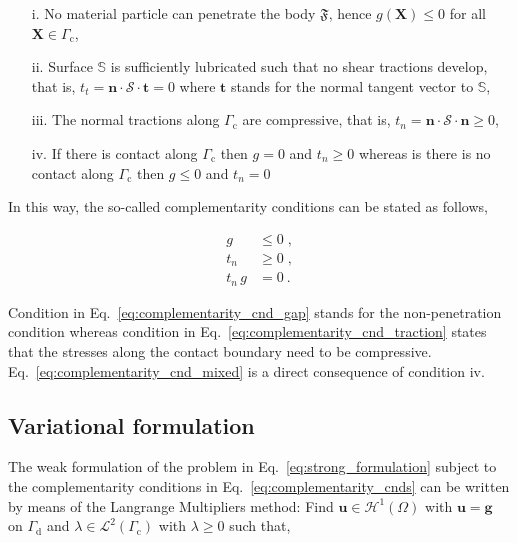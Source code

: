 \documentclass[10pt,a4paper]{article}
\begin{document}
\begin{itemize}

	\item[i.] No material particle can penetrate the body $\mathfrak{F}$, hence $g(\mathbf{X}) \le 0$ for all $\mathbf{X} \in \Gamma_{\text{c}}$,
	
	\item[ii.] Surface $\mathbb{S}$ is sufficiently lubricated such that no shear tractions develop, that is, $t_t = \mathbf{n} \cdot \boldsymbol{\mathcal{S}} \cdot \mathbf{t} = 0$ where $\mathbf{t}$ stands for the normal tangent vector to $\mathbb{S}$,
	
	\item[iii.] The normal tractions along $\Gamma_{\text{c}}$ are compressive, that is, $t_n = \mathbf{n} \cdot \boldsymbol{\mathcal{S}} \cdot \mathbf{n} \ge 0$,
	
	\item[iv.] If there is contact along $\Gamma_{\text{c}}$ then $g = 0$ and $t_n \ge 0$ whereas is there is no contact along $\Gamma_{\text{c}}$ then $g \le 0$ and $t_n = 0$

\end{itemize}

In this way, the so-called complementarity conditions can be stated as follows,

\begin{subequations}
	\begin{alignat}{1}
		g &\le 0 \;, \label{eq:complementarity_cnd_gap} \\
		t_n &\ge 0 \;,  \label{eq:complementarity_cnd_traction} \\
		t_n\,g &= 0 \:. \label{eq:complementarity_cnd_mixed} 
	\end{alignat}
	\label{eq:complementarity_cnds}
\end{subequations}

Condition in Eq.~\eqref{eq:complementarity_cnd_gap} stands for the non-penetration condition whereas condition in Eq.~\eqref{eq:complementarity_cnd_traction} states that the stresses along the contact boundary need to be compressive. Eq.~\eqref{eq:complementarity_cnd_mixed} is a direct consequence of condition iv.

\subsection{Variational formulation}\label{subsec:variational_formulation}

The weak formulation of the problem in Eq.~\eqref{eq:strong_formulation} subject to the complementarity conditions in Eq.~\eqref{eq:complementarity_cnds} can be written by means of the Langrange Multipliers method: Find $\mathbf{u} \in \boldsymbol{\mathcal{H}}^1 (\Omega)$ with $\mathbf{u} = \mathbf{g}$ on $\Gamma_{\text{d}}$ and $\lambda \in \mathcal{L}^2(\Gamma_{\text{c}})$ with $\lambda \ge 0$ such that,
\end{document}
